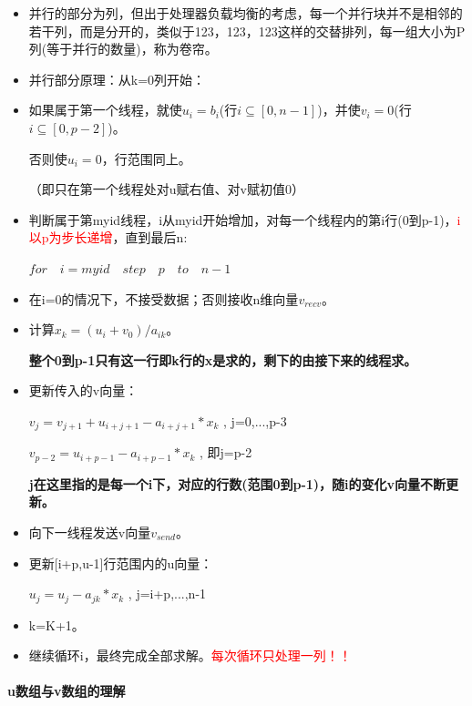 \documentclass[UTF8]{article}%
\begin{document}
\begin{itemize}
    \item 并行的部分为列，但出于处理器负载均衡的考虑，每一个并行块并不是相邻的若干列，而是分开的，类似于123，123，123这样的交替排列，每一组大小为P列(等于并行的数量)，称为卷帘。
    \item 并行部分原理：从k=0列开始：
    \item 如果属于第一个线程，就使$u_i=b_i$(行$i\subseteq [0,n-1]$)，并使$v_i=0$(行$i\subseteq [0,p-2]$)。
    
    否则使$u_i=0$，行范围同上。
    
    （即只在第一个线程处对u赋右值、对v赋初值0）

    \item 判断属于第myid线程，i从myid开始增加，对每一个线程内的第i行(0到p-1)，\textcolor{red}{i以p为步长递增}，直到最后n:
    
    $for \quad i=myid \quad step \quad p \quad to \quad n-1 $

    \item 在i=0的情况下，不接受数据；否则接收n维向量$v_{recv}$。
    \item 计算$x_k=(u_i+v_0)/a_{ik}$。
    
    \textbf{整个0到p-1只有这一行即k行的x是求的，剩下的由接下来的线程求。}

    \item 更新传入的v向量：
    
    $v_j=v_{j+1}+u_{i+j+1}-a_{i+j+1}*x_k$ , j=0,...,p-3

    $v_{p-2}=u_{i+p-1}-a_{i+p-1}*x_k$ , 即j=p-2

    \textbf{j在这里指的是每一个i下，对应的行数(范围0到p-1)，随i的变化v向量不断更新。}

    \item 向下一线程发送v向量$v_{send}$。
    \item 更新[i+p,u-1]行范围内的u向量：
    
    $u_j=u_j-a_{jk}*x_k$ , j=i+p,...,n-1

    \item k=K+1。
    \item 继续循环i，最终完成全部求解。\textcolor{red}{每次循环只处理一列！！}
\end{itemize}    

\paragraph{u数组与v数组的理解}~{}
\end{document}

